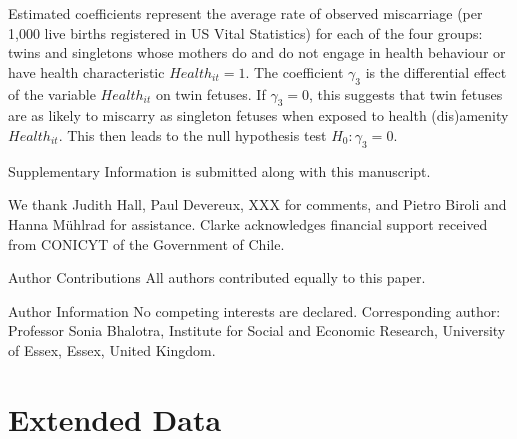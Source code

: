 \documentclass{nature}
\begin{document}
\begin{linenumbers}
Estimated coefficients represent the average rate of observed miscarriage (per 1,000 live births registered in US Vital Statistics) for each of the four groups: twins and singletons whose mothers do and do not engage in health behaviour or have health characteristic $Health_{it}=1$. The coefficient $\gamma_3$ is the differential effect of the variable $Health_{it}$ on twin fetuses.  If $\gamma_3=0$, this suggests that twin fetuses are as likely to miscarry as singleton fetuses when exposed to health (dis)amenity $Health_{it}$.  This then leads to the null hypothesis test $H_0: \gamma_3=0$.




\clearpage



\clearpage
\begin{addendum}
 \item[Supplementary Information] is submitted along with this manuscript.
 \item We thank Judith Hall, Paul Devereux, XXX for comments, and Pietro Biroli and Hanna M\"uhlrad for assistance.  Clarke acknowledges financial support received from CONICYT of the Government of Chile.
 \item[Author Contributions] All authors contributed equally to this paper.
 \item[Author Information] No competing interests are declared.  Corresponding author: Professor Sonia Bhalotra, Institute for Social and Economic Research, University of Essex, Essex, United Kingdom.
\end{addendum}

\clearpage
\section{Extended Data}
\setcounter{figure}{0}
\setcounter{table}{0}
\renewcommand{\tablename}{Extended Data Table}
\renewcommand{\figurename}{Extended Data Figure}


\end{linenumbers}
\end{document}
